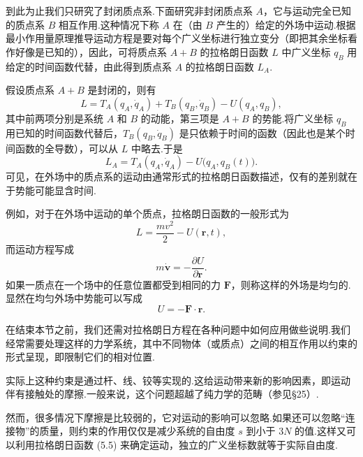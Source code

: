到此为止我们只研究了封闭质点系.下面研究非封闭质点系 $A$，它与运动完全已知的质点系 $B$ 相互作用.这种情况下称 $A$ 在（由 $B$ 产生的）给定的外场中运动.根据最小作用量原理推导运动方程是要对每个广义坐标进行独立变分（即把其余坐标看作好像是已知的），因此，可将质点系 $A+B$ 的拉格朗日函数 $L$ 中广义坐标 $q_B$ 用给定的时间函数代替，由此得到质点系 $A$ 的拉格朗日函数 $L_A$.

假设质点系 $A+B$ 是封闭的，则有
\begin{equation*}
  L=T_A(q_A,\dot{q}_A)+T_B(q_B,\dot{q}_B)-U(q_A,q_B),
\end{equation*}
其中前两项分别是系统 $A$ 和 $B$ 的动能，第三项是 $A+B$ 的势能.将广义坐标 $q_B$ 用已知的时间函数代替后，$T_B(q_B,\dot{q}_B)$ 是只依赖于时间的函数（因此也是某个时间函数的全导数），可以从 $L$ 中略去.于是
\begin{equation*}
  L_A=T_A(q_A,\dot{q}_A)-U\bigl(q_A,q_B(t)\bigr).
\end{equation*}
可见，在外场中的质点系的运动由通常形式的拉格朗日函数描述，仅有的差别就在于势能可能显含时间.

例如，对于在外场中运动的单个质点，拉格朗日函数的一般形式为
\begin{equation}
  L=\frac{mv^2}{2}-U(\boldsymbol{r},t),
\end{equation}
而运动方程写成
\begin{equation}
  m\dot{\boldsymbol{v}}=-\frac{\partial U}{\partial\boldsymbol{r}}.
\end{equation}
如果一质点在一个场中的任意位置都受到相同的力 $\boldsymbol{F}$，则称这样的外场是均匀的.显然在均匀外场中势能可以写成
\begin{equation}
  U=-\boldsymbol{F}\cdot\boldsymbol{r}.
\end{equation}

在结束本节之前，我们还需对拉格朗日方程在各种问题中如何应用做些说明.我们经常需要处理这样的力学系统，其中不同物体（或质点）之间的相互作用以约束的形式呈现，即限制它们的相对位置.

实际上这种约束是通过杆、线、铰等实现的.这给运动带来新的影响因素，即运动伴有接触处的摩擦.一般来说，这个问题超越了纯力学的范畴（参见§25）.

然而，很多情况下摩擦是比较弱的，它对运动的影响可以忽略.如果还可以忽略“连接物”的质量，则约束的作用仅仅是减少系统的自由度 $s$ 到小于 $3N$ 的值.这样又可以利用拉格朗日函数 (5.5) 来确定运动，独立的广义坐标数就等于实际自由度.

